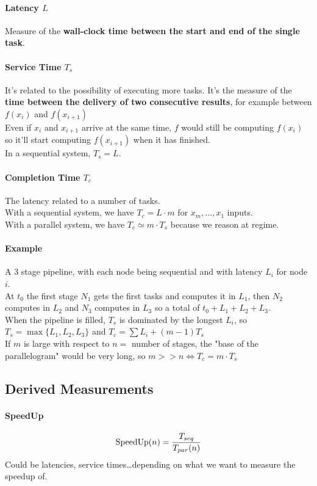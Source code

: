 \documentclass[10pt]{report}
\begin{document}
\paragraph{Latency $L$} Measure of the \textbf{wall-clock time between the start and end of the single task}.
\paragraph{Service Time $T_s$} It's related to the possibility of executing more tasks. It's the measure of the \textbf{time between the delivery of two consecutive results}, for example between $f(x_i)$ and $f(x_{i+1})$\\
Even if $x_i$ and $x_{i+1}$ arrive at the same time, $f$ would still be computing $f(x_i)$ so it'll start computing $f(x_{i+1})$ when it has finished.\\
In a sequential system, $T_s = L$.
\paragraph{Completion Time $T_c$} The latency related to a number of tasks.\\
With a sequential system, we have $T_c = L\cdot m$ for $x_m,\ldots,x_1$ inputs.\\
With a parallel system, we have $T_c\simeq m\cdot T_s$ because we reason at regime.
\paragraph{Example} A 3 stage pipeline, with each node being sequential and with latency $L_i$ for node $i$.\\
At $t_0$ the first stage $N_1$ gets the first tasks and computes it in $L_1$, then $N_2$ computes in $L_2$ and $N_3$ computes in $L_3$ so a total of $t_0 + L_1 + L_2 + L_3$.\\
When the pipeline is filled, $T_s$ is dominated by the longest $L_i$, so $T_s = \max\{L_1, L_2, L_3\}$ and $T_c = \sum L_i + (m-1)T_s$\\
If $m$ is large with respect to $n=$ number of stages, the "base of the parallelogram" would be very long, so $m >> n \Leftrightarrow T_c = m\cdot T_s$
\pagebreak
\subsection{Derived Measurements}
\paragraph{SpeedUp} $$\hbox{SpeedUp}(n) = \frac{T_{seq}}{T_{par}(n)}$$ Could be latencies, service times\ldots depending on what we want to measure the speedup of.
\end{document}
